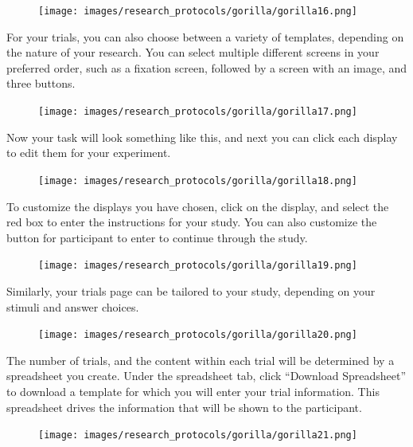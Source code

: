 \documentclass[
]{book}
\begin{document}
\begin{figure}
\centering
\texttt{[image: images/research\_protocols/gorilla/gorilla16.png]}
\caption{}
\end{figure}

For your trials, you can also choose between a variety of templates, depending on the nature of your research. You can select multiple different screens in your preferred order, such as a fixation screen, followed by a screen with an image, and three buttons.

\begin{figure}
\centering
\texttt{[image: images/research\_protocols/gorilla/gorilla17.png]}
\caption{}
\end{figure}

Now your task will look something like this, and next you can click each display to edit them for your experiment.

\begin{figure}
\centering
\texttt{[image: images/research\_protocols/gorilla/gorilla18.png]}
\caption{}
\end{figure}

To customize the displays you have chosen, click on the display, and select the red box to enter the instructions for your study. You can also customize the button for participant to enter to continue through the study.

\begin{figure}
\centering
\texttt{[image: images/research\_protocols/gorilla/gorilla19.png]}
\caption{}
\end{figure}

Similarly, your trials page can be tailored to your study, depending on your stimuli and answer choices.

\begin{figure}
\centering
\texttt{[image: images/research\_protocols/gorilla/gorilla20.png]}
\caption{}
\end{figure}

The number of trials, and the content within each trial will be determined by a spreadsheet you create. Under the spreadsheet tab, click ``Download Spreadsheet'' to download a template for which you will enter your trial information. This spreadsheet drives the information that will be shown to the participant.

\begin{figure}
\centering
\texttt{[image: images/research\_protocols/gorilla/gorilla21.png]}
\caption{}
\end{figure}
\end{document}
